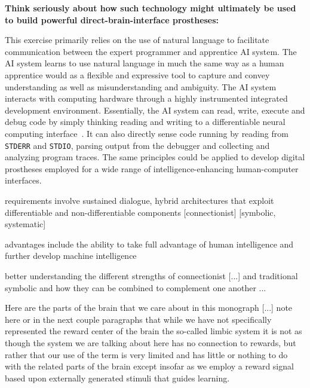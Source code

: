 \documentclass[letterpaper,12pt]{article}
\begin{document}

{\bf{Think seriously about how such technology might ultimately be used to build powerful direct-brain-interface prostheses:}}

This exercise primarily relies on the use of natural language to facilitate communication between the expert programmer and apprentice AI system. The AI system learns to use natural language in much the same way as a human apprentice would \emdash{} as a flexible and expressive tool to capture and convey understanding as well as misunderstanding and ambiguity. The AI system interacts with computing hardware through a highly instrumented integrated development environment. Essentially, the AI system can read, write, execute and debug code by simply thinking \emdash{} reading and writing to a differentiable neural computing interface~\cite{GravesetalNATURE-16}. It can also directly sense code running by reading from {\tt{STDERR}} and {\tt{STDIO}}, parsing output from the debugger and collecting and analyzing program traces. The same principles could be applied to develop digital prostheses employed for a wide range of intelligence-enhancing human-computer interfaces.


requirements involve sustained dialogue, hybrid architectures that exploit differentiable and non-differentiable components [connectionist] [symbolic, systematic]

advantages include the ability to take full advantage of human intelligence and further develop machine intelligence 

better understanding the different strengths of connectionist [...] and traditional symbolic and how they can be combined to complement one another ...



Here are the parts of the brain that we care about in this monograph [...] note here or in the next couple paragraphs that while we have not specifically represented the reward center of the brain \emdash{} the so-called limbic system \emdash{} it is not as though the system we are talking about here has no connection to rewards, but rather that our use of the term is very limited and has little or nothing to do with the related parts of the brain except insofar as we employ a reward signal based upon externally generated stimuli that guides learning.
\end{document}
